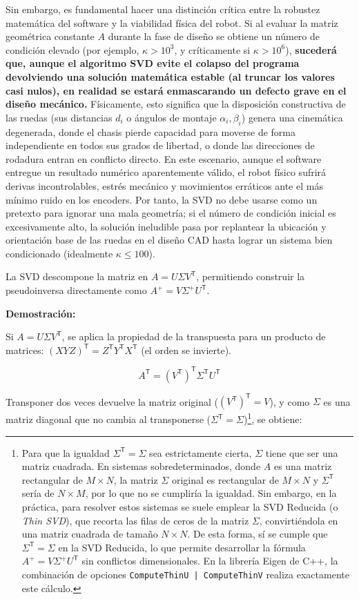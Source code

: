 \documentclass[11pt,a4paper]{article}
\newcommand{\trans}{\mathsf{T}}      %
\begin{document}
Sin embargo, es fundamental hacer una distinción crítica entre la robustez matemática del software y la viabilidad física del robot. Si al evaluar la matriz geométrica constante \(A\) durante la fase de diseño se obtiene un número de condición elevado (por ejemplo, \(\kappa > 10^3\), y críticamente si \(\kappa > 10^6\)), \textbf{sucederá que, aunque el algoritmo SVD evite el colapso del programa devolviendo una solución matemática estable (al truncar los valores casi nulos), en realidad se estará enmascarando un defecto grave en el diseño mecánico.} Físicamente, esto significa que la disposición constructiva de las ruedas (sus distancias \(d_i\) o ángulos de montaje \(\alpha_i, \beta_i\)) genera una cinemática degenerada, donde el chasis pierde capacidad para moverse de forma independiente en todos sus grados de libertad, o donde las direcciones de rodadura entran en conflicto directo. En este escenario, aunque el software entregue un resultado numérico aparentemente válido, el robot físico sufrirá derivas incontrolables, estrés mecánico y movimientos erráticos ante el más mínimo ruido en los encoders. Por tanto, la SVD no debe usarse como un pretexto para ignorar una mala geometría; si el número de condición inicial es excesivamente alto, la solución ineludible pasa por replantear la ubicación y orientación base de las ruedas en el diseño CAD hasta lograr un sistema bien condicionado (idealmente \(\kappa \le 100\)).

La SVD descompone la matriz en \(A = U \Sigma V^{\trans}\), permitiendo construir la pseudoinversa directamente como \(A^+ = V \Sigma^+ U^{\trans}\).

\textbf{Demostración:}

Si \(A = U \Sigma V^{\trans}\), se aplica la propiedad de la transpuesta para un producto de matrices: \((X Y Z)^{\trans} = Z^{\trans} Y^{\trans} X^{\trans}\) (el orden se invierte).

\begin{equation}
    A^{\trans} = (V^{\trans})^{\trans} \Sigma^{\trans} U^{\trans}
\end{equation}

Transponer dos veces devuelve la matriz original (\((V^{\trans})^{\trans} = V\)), y como \(\Sigma\) es una matriz diagonal que no cambia al transponerse (\(\Sigma^{\trans} = \Sigma\))\footnote{Para que la igualdad \(\Sigma^{\trans} = \Sigma\) sea estrictamente cierta, \(\Sigma\) tiene que ser una matriz cuadrada. En sistemas sobredeterminados, donde \(A\) es una matriz rectangular de \(M \times N\), la matriz \(\Sigma\) original es rectangular de \(M \times N\) y \(\Sigma^{\trans}\) sería de \(N \times M\), por lo que no se cumpliría la igualdad. Sin embargo, en la práctica, para resolver estos sistemas se suele emplear la SVD Reducida (o \textit{Thin SVD}), que recorta las filas de ceros de la matriz \(\Sigma\), convirtiéndola en una matriz cuadrada de tamaño \(N \times N\). De esta forma, sí se cumple que \(\Sigma^{\trans} = \Sigma\) en la SVD Reducida, lo que permite desarrollar la fórmula \(A^+ = V \Sigma^+ U^{\trans}\) sin conflictos dimensionales. En la librería Eigen de C++, la combinación de opciones \texttt{ComputeThinU | ComputeThinV} realiza exactamente este cálculo.}, se obtiene:
\end{document}
